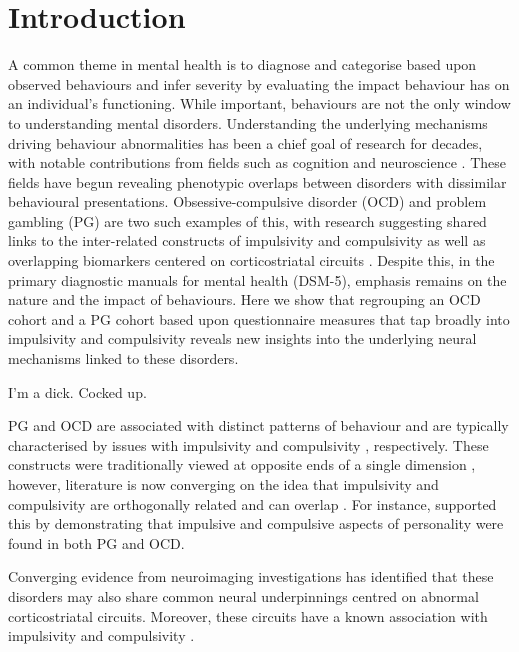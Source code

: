 \section{Introduction}

A common theme in mental health is to diagnose and categorise based upon observed behaviours and infer severity by evaluating the impact behaviour has on an individual's functioning. While important, behaviours are not the only window to understanding mental disorders. Understanding the underlying mechanisms driving behaviour abnormalities has been a chief goal of research for decades, with notable contributions from fields such as cognition and neuroscience \cite{Frank_2015}. These fields have begun revealing phenotypic overlaps between disorders with dissimilar behavioural presentations. Obsessive-compulsive disorder (OCD) and problem gambling (PG) are two such examples of this, with research suggesting shared links to the inter-related constructs of impulsivity and compulsivity \cite{Tavares_2007} as well as overlapping biomarkers centered on corticostriatal circuits \cite{van_Holst_2010,Harrison_2009,Harrison_2013}. Despite this, in the primary diagnostic manuals for mental health (DSM-5), emphasis remains on the nature and the impact of behaviours. Here we show that regrouping an OCD cohort and a PG cohort based upon questionnaire measures that tap broadly into impulsivity and compulsivity reveals new insights into the underlying neural mechanisms linked to these disorders.

I'm a dick. Cocked up.


PG and OCD are associated with distinct patterns of behaviour and are typically characterised by issues with impulsivity \cite{Goudriaan_2004} and compulsivity \cite{Stein_1994}, respectively. These constructs were traditionally viewed at opposite ends of a single dimension \cite{Fineberg_2009}, however, literature is now converging on the idea that impulsivity and compulsivity are orthogonally related and can overlap \cite{Fineberg_2009,Fontenelle_2011}. For instance, \citet{Tavares_2007} supported this by demonstrating that impulsive and compulsive aspects of personality were found in both PG and OCD.


Converging evidence from neuroimaging investigations has identified that these disorders may also share common neural underpinnings centred on abnormal corticostriatal circuits. Moreover, these circuits have a known association with impulsivity and compulsivity \cite{Torregrossa2008}.






